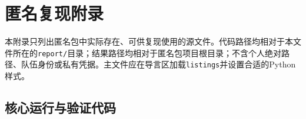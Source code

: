 \section{匿名复现附录}
本附录只列出匿名包中实际存在、可供复现使用的源文件。代码路径均相对于本文件所在的\texttt{report/}目录；结果路径均相对于匿名包项目根目录；不含个人绝对路径、队伍身份或私有凭据。主文件应在导言区加载\texttt{listings}并设置合适的Python样式。

\subsection{核心运行与验证代码}



















